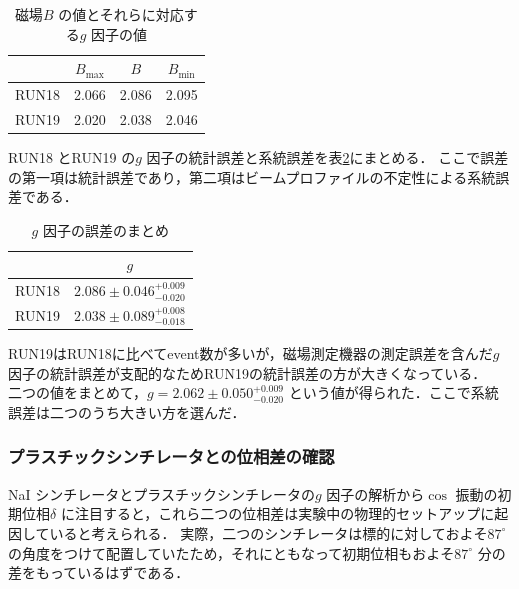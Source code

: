 \begin{table}[H]
\caption{磁場$B$ の値とそれらに対応する$g$ 因子の値}
\centering
\begin{tabular}{cccc}\toprule%
{} & $B_\mathrm{max}$ & $B$ & $B_\mathrm{min}$  \\ \midrule
RUN18 & 2.066 & 2.086 & 2.095 \\
RUN19 & 2.020 & 2.038 & 2.046 \\ \bottomrule
\end{tabular}
\label{tab:mag_g}
\end{table}

RUN18 とRUN19 の$g$ 因子の統計誤差と系統誤差を表\ref{tab:NaIggosamatome}にまとめる．
ここで誤差の第一項は統計誤差であり，第二項はビームプロファイルの不定性による系統誤差である．

\begin{table}[H]%
\caption{$g$ 因子の誤差のまとめ}
\centering
\begingroup
\renewcommand{\arraystretch}{1.2}%
\begin{tabular}{cc}\toprule
{} &   $g$  \\ \midrule
RUN18 & $2.086 \pm 0.046^{+0.009}_{-0.020} $  \\
RUN19 & $2.038 \pm 0.089^{+0.008}_{-0.018} $  \\ \bottomrule
\end{tabular}\label{tab:NaIggosamatome}
\endgroup
\end{table}

RUN19はRUN18に比べてevent数が多いが，磁場測定機器の測定誤差を含んだ$g$ 因子の統計誤差が支配的なためRUN19の統計誤差の方が大きくなっている．\\
二つの値をまとめて，$g = 2.062 \pm 0.050^{+0.009}_{-0.020}$ という値が得られた．ここで系統誤差は二つのうち大きい方を選んだ．

\subsubsection{プラスチックシンチレータとの位相差の確認}
\label{subsubsec:PhaseCheck}

NaI シンチレータとプラスチックシンチレータの$g$ 因子の解析から$\cos$ 振動の初期位相$\delta$ に注目すると，これら二つの位相差は実験中の物理的セットアップに起因していると考えられる．
実際，二つのシンチレータは標的に対しておよそ$87^{\circ}$ の角度をつけて配置していたため，それにともなって初期位相もおよそ$87^{\circ}$ 分の差をもっているはずである．

